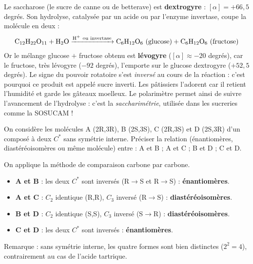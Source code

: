 \documentclass[11pt]{article}
\newcommand{\cle}[1]{{\popxbold\color{popdark}#1}}
\begin{document}
\begin{savaistu}
Le saccharose (le sucre de canne ou de betterave) est \textbf{dextrogyre} : $[\alpha] = +66,5$ degrés. Son hydrolyse, catalysée par un acide ou par l'enzyme invertase, coupe la molécule en deux :
\[ \ce{C12H22O11 + H2O ->[H^+\ \text{ou invertase}] C6H12O6\ (glucose) + C6H12O6\ (fructose)} \]
Or le mélange glucose $+$ fructose obtenu est \textbf{lévogyre} ($[\alpha] \approx -20$ degrés), car le fructose, très lévogyre ($-92$ degrés), l'emporte sur le glucose dextrogyre ($+52,5$ degrés). Le signe du pouvoir rotatoire s'est \emph{inversé} au cours de la réaction : c'est pourquoi ce produit est appelé \cle{sucre inverti}. Les pâtissiers l'adorent car il retient l'humidité et garde les gâteaux moelleux. Le polarimètre permet ainsi de suivre l'avancement de l'hydrolyse : c'est la \emph{saccharimétrie}, utilisée dans les sucreries comme la SOSUCAM !
\end{savaistu}

\begin{exercice}
On considère les molécules A (2R,3R), B (2S,3S), C (2R,3S) et D (2S,3R) d'un composé à deux $C^*$ sans symétrie interne. Préciser la relation (énantiomères, diastéréoisomères ou même molécule) entre : A et B ; A et C ; B et D ; C et D.
\end{exercice}

\begin{corrige}[Exercice 1]
On applique la méthode de comparaison carbone par carbone.
\begin{itemize}
\item \textbf{A et B} : les deux $C^*$ sont inversés (R$\to$S et R$\to$S) : \textbf{énantiomères}.
\item \textbf{A et C} : $C_2$ identique (R,R), $C_3$ inversé (R$\to$S) : \textbf{diastéréoisomères}.
\item \textbf{B et D} : $C_2$ identique (S,S), $C_3$ inversé (S$\to$R) : \textbf{diastéréoisomères}.
\item \textbf{C et D} : les deux $C^*$ sont inversés : \textbf{énantiomères}.
\end{itemize}
Remarque : sans symétrie interne, les quatre formes sont bien distinctes ($2^2 = 4$), contrairement au cas de l'acide tartrique.
\end{corrige}
\end{document}
